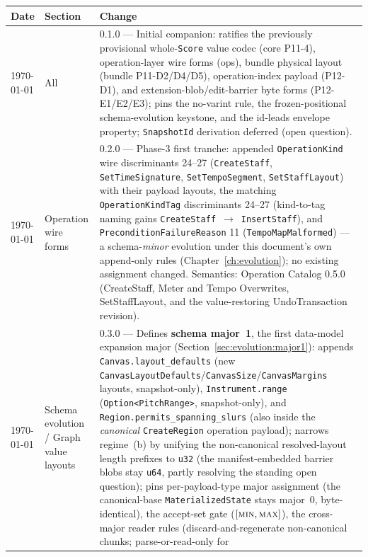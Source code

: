 \documentclass[11pt,letterpaper]{report}
\newcommand{\tablenums}[1]{{\addfontfeatures{Numbers={Lining,Tabular}}#1}}
\newcommand{\sectionsc}[1]{{\addfontfeatures{Letters=SmallCaps}#1}}
\begin{document}
\begin{longtable}{p{2cm} p{2.5cm} p{9cm}}
  \toprule
  \textbf{Date} & \textbf{Section} & \textbf{Change} \\
  \midrule
  \endhead
  \today & All & 0.1.0 --- Initial companion: ratifies the previously
  provisional whole-\texttt{Score} value codec (core P11-4), operation-layer
  wire forms (ops), bundle physical layout (bundle P11-D2/D4/D5),
  operation-index payload (P12-D1), and extension-blob/edit-barrier byte
  forms (P12-E1/E2/E3); pins the no-varint rule, the frozen-positional
  schema-evolution keystone, and the id-leads envelope property;
  \texttt{SnapshotId} derivation deferred (open question). \\
    \today & Operation wire forms & 0.2.0 --- Phase-3 first tranche: appended
  \texttt{OperationKind} wire discriminants \tablenums{24}--\tablenums{27}
  (\texttt{CreateStaff}, \texttt{SetTimeSignature},
  \texttt{SetTempoSegment}, \texttt{SetStaffLayout}) with their payload
  layouts, the matching \texttt{OperationKindTag} discriminants
  \tablenums{24}--\tablenums{27} (kind-to-tag naming gains
  \texttt{CreateStaff}~$\rightarrow$~\texttt{InsertStaff}), and
  \texttt{PreconditionFailureReason} \tablenums{11}
  (\texttt{TempoMapMalformed}) --- a schema-\emph{minor} evolution under this
  document's own append-only rules (Chapter~\ref{ch:evolution}); no existing
  assignment changed. Semantics: Operation Catalog 0.5.0 (\sectionsc{CreateStaff},
  \sectionsc{Meter and Tempo Overwrites}, \sectionsc{SetStaffLayout}, and the
  value-restoring \sectionsc{UndoTransaction} revision). \\
  \today & Schema evolution / Graph value layouts & 0.3.0 --- Defines
  \textbf{schema major~1}, the first data-model expansion major
  (Section~\ref{sec:evolution:major1}): appends \texttt{Canvas.layout\_defaults}
  (new \texttt{CanvasLayoutDefaults}/\texttt{CanvasSize}/\texttt{CanvasMargins}
  layouts, snapshot-only), \texttt{Instrument.range} (\texttt{Option<PitchRange>},
  snapshot-only), and \texttt{Region.permits\_spanning\_slurs} (also inside the
  \emph{canonical} \texttt{CreateRegion} operation payload); narrows regime~(b)
  by unifying the non-canonical resolved-layout length prefixes to \texttt{u32}
  (the manifest-embedded barrier blobs stay \texttt{u64}, partly resolving the
  standing open question); pins per-payload-type major assignment (the
  canonical-base \texttt{MaterializedState} stays major~0, byte-identical),
  the accept-set gate ($[\textsc{min},\textsc{max}]$), the cross-major reader
  rules (discard-and-regenerate non-canonical chunks; parse-or-read-only for

\end{longtable}
\end{document}
